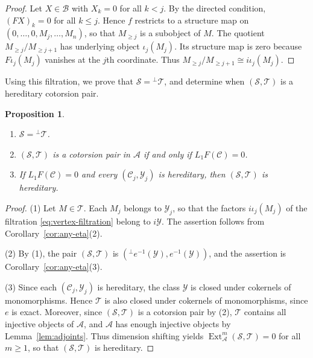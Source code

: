 \documentclass[11pt]{amsart}
\newtheorem{proposition}[theorem]{Proposition}
\theoremstyle{definition}
\theoremstyle{remark}
\theoremstyle{plain}
\numberwithin{equation}{section}
\begin{document}
\begin{proof}
	Let $X\in\mathcal{B}$ with $X_k=0$ for all $k<j$. By the directed condition,
	$(FX)_k=0$ for all $k\leq j$. Hence $f$ restricts to a structure map on
	$(0,\ldots,0,M_j,\ldots,M_n)$, so that $M_{\geq j}$ is a subobject of $M$.
	The quotient $M_{\geq j}/M_{\geq j+1}$ has underlying object $\iota_j(M_j)$.
	Its structure map is zero because $F\iota_j(M_j)$ vanishes at the $j$th
	coordinate. Thus $M_{\geq j}/M_{\geq j+1}\cong i\iota_j(M_j)$.
\end{proof}

Using this filtration, we prove that $\mathcal{S}={}^\perp\mathcal{T}$, and determine when
$(\mathcal{S},\mathcal{T})$ is a hereditary cotorsion pair.

\begin{proposition}\label{prop:directed-pair}
	\begin{enumerate}
		\item $\mathcal{S}={}^\perp\mathcal{T}$.
		\item $(\mathcal{S},\mathcal{T})$ is a cotorsion pair in $\mathcal{A}$ if and only if
		$L_1F(\mathcal{C})=0$.
		\item If $L_1F(\mathcal{C})=0$ and every $(\mathcal{C}_j,\mathcal{Y}_j)$ is hereditary, then
		$(\mathcal{S},\mathcal{T})$ is hereditary.
	\end{enumerate}
\end{proposition}

\begin{proof}
	(1) Let $M\in\mathcal{T}$. Each $M_j$ belongs to $\mathcal{Y}_j$, so that the factors
	$i\iota_j(M_j)$ of the filtration \eqref{eq:vertex-filtration} belong to
	$i\mathcal{Y}$. The assertion follows from Corollary~\ref{cor:any-eta}(2).

	(2) By (1), the pair $(\mathcal{S},\mathcal{T})$ is
	$({}^\perp e^{-1}(\mathcal{Y}),e^{-1}(\mathcal{Y}))$, and the assertion is
	Corollary~\ref{cor:any-eta}(3).

	(3) Since each $(\mathcal{C}_j,\mathcal{Y}_j)$ is hereditary, the class $\mathcal{Y}$ is closed
	under cokernels of monomorphisms. Hence $\mathcal{T}$ is also closed under
	cokernels of monomorphisms, since $e$ is exact. Moreover, since
	$(\mathcal{S},\mathcal{T})$ is a cotorsion pair by (2), $\mathcal{T}$ contains all injective
	objects of $\mathcal{A}$, and $\mathcal{A}$ has enough injective objects by
	Lemma~\ref{lem:adjoints}. Thus dimension shifting yields
	$\operatorname{Ext}^m_{\mathcal{A}}(\mathcal{S},\mathcal{T})=0$ for all $m\geq1$, so that
	$(\mathcal{S},\mathcal{T})$ is hereditary.
\end{proof}
\end{document}
